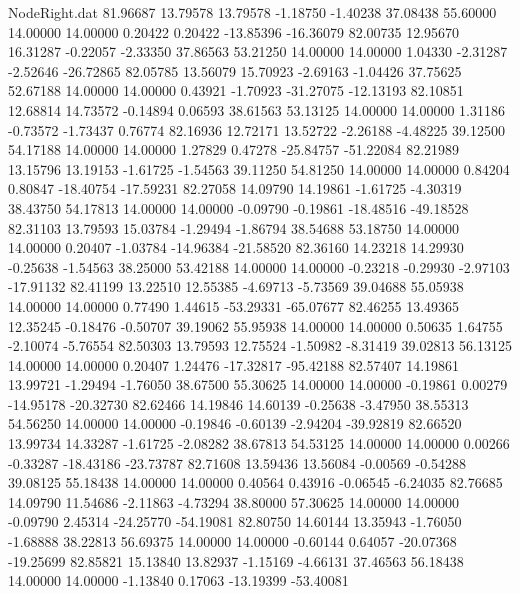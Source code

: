 \begin{filecontents}{NodeRight.dat}
  81.96687   13.79578   13.79578    -1.18750   -1.40238   37.08438   55.60000   14.00000   14.00000    0.20422    0.20422  -13.85396  -16.36079
  82.00735   12.95670   16.31287    -0.22057   -2.33350   37.86563   53.21250   14.00000   14.00000    1.04330   -2.31287   -2.52646  -26.72865
  82.05785   13.56079   15.70923    -2.69163   -1.04426   37.75625   52.67188   14.00000   14.00000    0.43921   -1.70923  -31.27075  -12.13193
  82.10851   12.68814   14.73572    -0.14894    0.06593   38.61563   53.13125   14.00000   14.00000    1.31186   -0.73572   -1.73437    0.76774
  82.16936   12.72171   13.52722    -2.26188   -4.48225   39.12500   54.17188   14.00000   14.00000    1.27829    0.47278  -25.84757  -51.22084
  82.21989   13.15796   13.19153    -1.61725   -1.54563   39.11250   54.81250   14.00000   14.00000    0.84204    0.80847  -18.40754  -17.59231
  82.27058   14.09790   14.19861    -1.61725   -4.30319   38.43750   54.17813   14.00000   14.00000   -0.09790   -0.19861  -18.48516  -49.18528
  82.31103   13.79593   15.03784    -1.29494   -1.86794   38.54688   53.18750   14.00000   14.00000    0.20407   -1.03784  -14.96384  -21.58520
  82.36160   14.23218   14.29930    -0.25638   -1.54563   38.25000   53.42188   14.00000   14.00000   -0.23218   -0.29930   -2.97103  -17.91132
  82.41199   13.22510   12.55385    -4.69713   -5.73569   39.04688   55.05938   14.00000   14.00000    0.77490    1.44615  -53.29331  -65.07677
  82.46255   13.49365   12.35245    -0.18476   -0.50707   39.19062   55.95938   14.00000   14.00000    0.50635    1.64755   -2.10074   -5.76554
  82.50303   13.79593   12.75524    -1.50982   -8.31419   39.02813   56.13125   14.00000   14.00000    0.20407    1.24476  -17.32817  -95.42188
  82.57407   14.19861   13.99721    -1.29494   -1.76050   38.67500   55.30625   14.00000   14.00000   -0.19861    0.00279  -14.95178  -20.32730
  82.62466   14.19846   14.60139    -0.25638   -3.47950   38.55313   54.56250   14.00000   14.00000   -0.19846   -0.60139   -2.94204  -39.92819
  82.66520   13.99734   14.33287    -1.61725   -2.08282   38.67813   54.53125   14.00000   14.00000    0.00266   -0.33287  -18.43186  -23.73787
  82.71608   13.59436   13.56084    -0.00569   -0.54288   39.08125   55.18438   14.00000   14.00000    0.40564    0.43916   -0.06545   -6.24035
  82.76685   14.09790   11.54686    -2.11863   -4.73294   38.80000   57.30625   14.00000   14.00000   -0.09790    2.45314  -24.25770  -54.19081
  82.80750   14.60144   13.35943    -1.76050   -1.68888   38.22813   56.69375   14.00000   14.00000   -0.60144    0.64057  -20.07368  -19.25699
  82.85821   15.13840   13.82937    -1.15169   -4.66131   37.46563   56.18438   14.00000   14.00000   -1.13840    0.17063  -13.19399  -53.40081

\end{filecontents}
